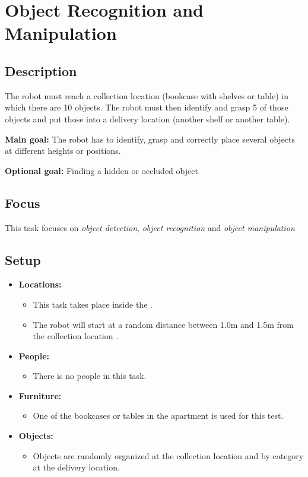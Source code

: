 \section{Object Recognition and Manipulation}
\label{test:object-recognition-and-manupulation}

\subsection*{Description}
The robot must reach a collection location (bookcase with shelves or table) in which there are 10 objects. The robot must then identify and grasp 5 of those objects and put those into a delivery location (another shelf or another table).

\noindent \textbf{Main goal:}
The robot has to identify, grasp and correctly place several objects at different heights or positions.

\noindent \textbf{Optional goal:}
Finding a hidden or occluded object

\subsection*{Focus}
This task focuses on
\textit{object detection},
\textit{object recognition} and
\textit{object manipulation}

\subsection*{Setup}
\begin{itemize}[nosep]	
	\item \textbf{Locations:} 
	\begin{itemize}
		\item This task takes place inside the \Arena{}.
		\item The robot will start at a random distance between 1.0m and 1.5m from the collection location .
	\end{itemize}	 
	\item \textbf{People:} 
	\begin{itemize}
		\item There is no people in this task.
	\end{itemize}
	\item \textbf{Furniture:} 
	\begin{itemize}
		\item One of the bookcases or tables in the apartment is used for this test.
	\end{itemize}
    \item \textbf{Objects:} 
    \begin{itemize}
		\item Objects are randomly organized at the collection location and by category at the delivery location.
	\end{itemize}
\end{itemize}

